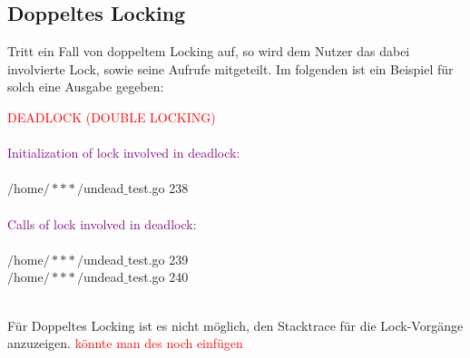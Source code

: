 \subsection{Doppeltes Locking}
Tritt ein Fall von doppeltem Locking auf, so wird dem Nutzer das dabei 
involvierte Lock, sowie seine Aufrufe mitgeteilt. Im folgenden ist ein Beispiel
für solch eine Ausgabe gegeben:
\begin{mdframed}[leftmargin=10pt,rightmargin=10pt]
  \textcolor{red}{DEADLOCK (DOUBLE LOCKING)}\\\\
  \textcolor{purple}{Initialization of lock involved in deadlock:}\\\\
  $/$home$/***/$undead$\_$test.go 238\\\\
  \textcolor{purple}{Calls of lock involved in deadlock:}\\\\
  $/$home$/***/$undead$\_$test.go 239\\
  $/$home$/***/$undead$\_$test.go 240\\\\
\end{mdframed}
Für Doppeltes Locking ist es nicht möglich, den Stacktrace für die Lock-Vorgänge
anzuzeigen. \textcolor{red}{könnte man des noch einfügen}
